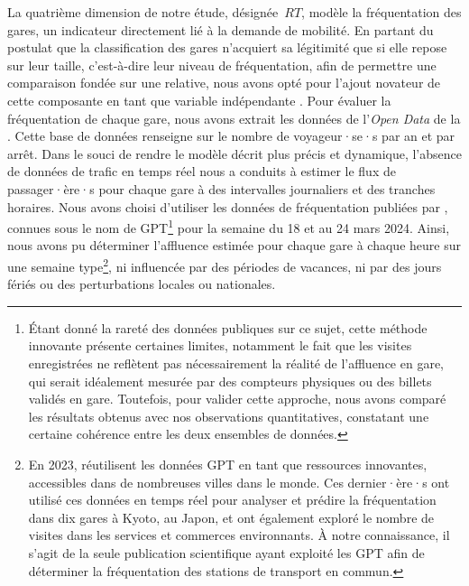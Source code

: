 \begin{refsegment}
La quatrième dimension de notre étude, désignée~\(RT\), modèle la fréquentation des gares, un indicateur directement lié à la demande de mobilité. En partant du postulat que la classification des gares n'acquiert sa légitimité que si elle repose sur leur taille, c'est-à-dire leur niveau de fréquentation, afin de permettre une comparaison fondée sur une  relative, nous avons opté pour l'ajout novateur de cette composante en tant que variable indépendante 
\textcolor{blue}{\autocite[194]{reusser_classifying_2008}}. Pour évaluer la fréquentation de chaque gare, nous avons extrait les données de l'\textsl{Open Data} de la \textcolor{blue}{\textcite{sncf_frequentation_2024}}. Cette base de données renseigne sur le nombre de voyageur·se·s par an et par arrêt. Dans le souci de rendre le modèle décrit plus précis et dynamique, l'absence de données de trafic en temps réel nous a conduits à estimer le flux de passager·ère·s pour chaque gare à des intervalles journaliers et des tranches horaires. Nous avons choisi d'utiliser les données de fréquentation publiées par \textcolor{blue}{\textcite{google_maps_google_2024}}, connues sous le nom de \acrfull{GPT}\footnote{
    Étant donné la rareté des données publiques sur ce sujet, cette méthode innovante présente certaines limites, notamment le fait que les visites enregistrées ne reflètent pas nécessairement la réalité de l'affluence en gare, qui serait idéalement mesurée par des compteurs physiques ou des billets validés en gare. Toutefois, pour valider cette approche, nous avons comparé les résultats obtenus avec nos observations quantitatives, constatant une certaine cohérence entre les deux ensembles de données.
} pour la semaine du 18 et au 24 mars 2024. Ainsi, nous avons pu déterminer l'affluence estimée pour chaque gare à chaque heure sur une semaine type\footnote{
    En 2023, \textcolor{blue}{\textcite[5]{vongvanich_explaining_2023}} réutilisent les données \acrshort{GPT} en tant que ressources innovantes, accessibles dans de nombreuses villes dans le monde. Ces dernier·ère·s ont utilisé ces données en temps réel pour analyser et prédire la fréquentation dans dix gares à Kyoto, au Japon, et ont également exploré le nombre de visites dans les services et commerces environnants. À notre connaissance, il s'agit de la seule publication scientifique ayant exploité les \acrshort{GPT} afin de déterminer la fréquentation des stations de transport en commun.
}, ni influencée par des périodes de vacances, ni par des jours fériés ou des perturbations locales ou nationales.%


\end{refsegment}
